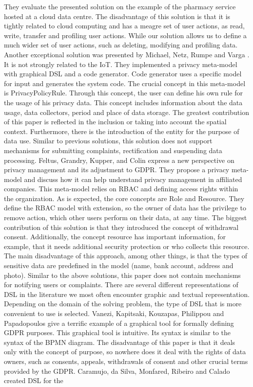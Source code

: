 \documentclass[11pt,english]{article}
\begin{document}
They evaluate the presented solution on the example of the pharmacy service hosted at a cloud data centre. The disadvantage of this solution is that it is tightly related to cloud computing and has a meagre set of user actions, as read, write, transfer and profiling user actions. While our solution allows us to define a much wider set of user actions, such as deleting, modifying and profiling data. Another exceptional solution was presented by Michael, Netz, Rumpe and Varga \cite{michael2019towards}. It is not strongly related to the IoT. They implemented a privacy meta-model with graphical DSL and a code generator. Code generator uses a specific model for input and generates the system code. The crucial concept in this meta-model is PrivacyPolicyRule. Through this concept, the user can define his own rule for the usage of his privacy data. This concept includes information about the data usage, data collectors, period and place of data storage. The greatest contribution of this paper is reflected in the inclusion or taking into account the spatial context. Furthermore, there is the introduction of the entity for the purpose of data use. Similar to previous solutions, this solution does not support mechanisms for submitting complaints, rectification and suspending data processing. \newline Feltus, Grandry, Kupper, and Colin \cite{feltus2017model} express a new perspective on privacy management and its adjustment to GDPR. They propose a privacy meta-model and discuss how it can help understand privacy management in affiliated companies. This meta-model relies on RBAC and defining access rights within the organization. As is expected, the core concepts are Role and Resource. They define the RBAC model with extension, so the owner of data has the privilege to remove action, which other users perform on their data, at any time. The biggest contribution of this solution is that they introduced the concept of withdrawal consent. Additionally, the concept resource has important information, for example, that it needs additional security protection or who collects this resource. The main disadvantage of this approach, among other things, is that the types of sensitive data are predefined in the model (name, bank account, address and photo). Similar to the above solutions, this paper does not contain mechanisms for notifying users or complaints. \newline There are several different representations of DSL in the literature we most often encounter graphic and textual representation. Depending on the domain of the solving problem, the type of DSL that is more convenient to use is selected. Vanezi, Kapitsaki, Kouzapas, Philippou and Papadopoulos \cite{vanezi2020dialogop} give a terrific example of a graphical tool for formally defining GDPR purposes. This graphical tool is intuitive. Its syntax is similar to the syntax of the BPMN diagram. The disadvantage of this paper is that it deals only with the concept of purpose, so nowhere does it deal with the rights of data owners, such as consents, appeals, withdrawals of consent and other crucial terms provided by the GDPR. Caramujo, da Silva, Monfared, Ribeiro and Calado \cite{caramujo2019rsl} created DSL for the 
\end{document}
